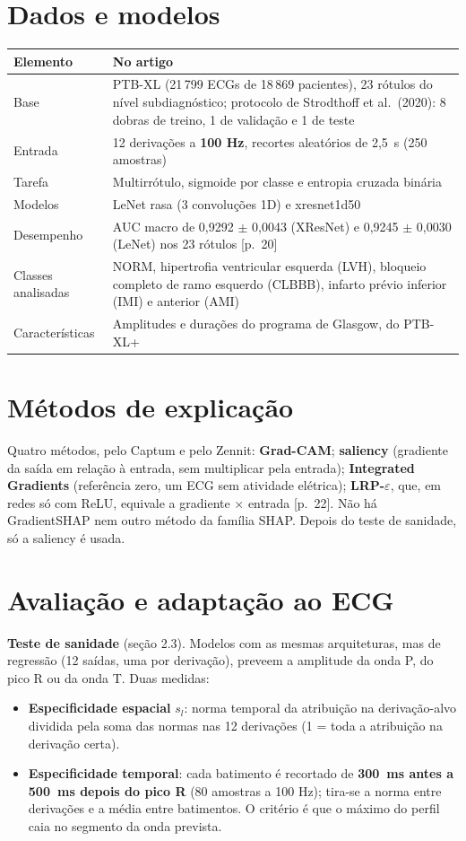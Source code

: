 \documentclass[11pt,a4paper]{article}
\begin{document}
\section{Dados e modelos}
\begin{center}\small
\begin{tabularx}{\linewidth}{lX}
\toprule
\textbf{Elemento} & \textbf{No artigo} \\
\midrule
Base & PTB-XL (21\,799 ECGs de 18\,869 pacientes), 23 rótulos do nível subdiagnóstico; protocolo de Strodthoff et al.\ (2020): 8 dobras de treino, 1 de validação e 1 de teste \\
Entrada & 12 derivações a \textbf{100 Hz}, recortes aleatórios de 2,5~s (250 amostras) \\
Tarefa & Multirrótulo, sigmoide por classe e entropia cruzada binária \\
Modelos & LeNet rasa (3 convoluções 1D) e xresnet1d50 \\
Desempenho & AUC macro de 0,9292 $\pm$ 0,0043 (XResNet) e 0,9245 $\pm$ 0,0030 (LeNet) nos 23 rótulos [p.~20] \\
Classes analisadas & NORM, hipertrofia ventricular esquerda (LVH), bloqueio completo de ramo esquerdo (CLBBB), infarto prévio inferior (IMI) e anterior (AMI) \\
Características & Amplitudes e durações do programa de Glasgow, do PTB-XL+ \\
\bottomrule
\end{tabularx}
\end{center}

\section{Métodos de explicação}
Quatro métodos, pelo Captum e pelo Zennit: \textbf{Grad-CAM}; \textbf{saliency} (gradiente da saída em relação à entrada, sem multiplicar pela entrada); \textbf{Integrated Gradients} (referência zero, um ECG sem atividade elétrica); \textbf{LRP-$\varepsilon$}, que, em redes só com ReLU, equivale a gradiente × entrada [p.~22]. Não há GradientSHAP nem outro método da família SHAP. Depois do teste de sanidade, só a saliency é usada.

\section{Avaliação e adaptação ao ECG}
\textbf{Teste de sanidade} (seção 2.3). Modelos com as mesmas arquiteturas, mas de regressão (12 saídas, uma por derivação), preveem a amplitude da onda P, do pico R ou da onda T. Duas medidas:
\begin{itemize}
\item \textbf{Especificidade espacial} $s_l$: norma temporal da atribuição na derivação-alvo dividida pela soma das normas nas 12 derivações (1 = toda a atribuição na derivação certa).
\item \textbf{Especificidade temporal}: cada batimento é recortado de \textbf{300~ms antes a 500~ms depois do pico R} (80 amostras a 100 Hz); tira-se a norma entre derivações e a média entre batimentos. O critério é que o máximo do perfil caia no segmento da onda prevista.
\end{itemize}
\end{document}
